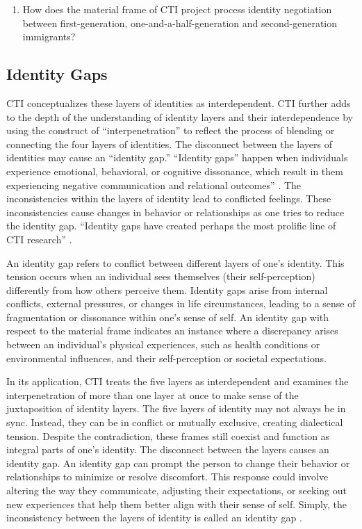 \begin{enumerate}
    \item[3.] How does the material frame of CTI project process identity negotiation between first-generation, one-and-a-half-generation and second-generation immigrants?
\end{enumerate}

\subsection{Identity Gaps}

CTI conceptualizes these layers of identities as interdependent. CTI further adds to the depth of the understanding of identity layers and their interdependence by using the construct of ``interpenetration'' to reflect the process of blending or connecting the four layers of identities. The disconnect between the layers of identities may cause an ``identity gap.'' ``Identity gaps'' happen when individuals experience emotional, behavioral, or cognitive dissonance, which result in them experiencing negative communication and relational outcomes'' \citep[p.~225]{hecht2002ResearchOdyssey1993}. The inconsistencies within the layers of identity lead to conflicted feelings. These inconsistencies cause changes in behavior or relationships as one tries to reduce the identity gap. ``Identity gaps have created perhaps the most prolific line of CTI research'' \citep[p.~226]{hecht2002ResearchOdyssey1993}. 

An identity gap refers to conflict between different layers of one's identity. This tension occurs when an individual sees themselves (their self-perception) differently from how others perceive them. Identity gaps arise from internal conflicts, external pressures, or changes in life circumstances, leading to a sense of fragmentation or dissonance within one's sense of self. An identity gap with respect to the material frame indicates an instance where a discrepancy arises between an individual's physical experiences, such as health conditions or environmental influences, and their self-perception or societal expectations.  

In its application, CTI treats the five layers as interdependent and examines the interpenetration of more than one layer at once to make sense of the juxtaposition of identity layers. The five layers of identity may not always be in sync. Instead, they can be in conflict or mutually exclusive, creating dialectical tension. Despite the contradiction, these frames still coexist and function as integral parts of one’s identity. The disconnect between the layers causes an identity gap. An identity gap can prompt the person to change their behavior or relationships to minimize or resolve discomfort. This response could involve altering the way they communicate, adjusting their expectations, or seeking out new experiences that help them better align with their sense of self. Simply, the inconsistency between the layers of identity is called an identity gap \citep{hechtCommunicationTheoryIdentity2021, jungElaboratingCommunicationTheory2004, kuiperBridgingGapsAdvancing2023, shinCommunicationTheoryIdentity2017}. 


